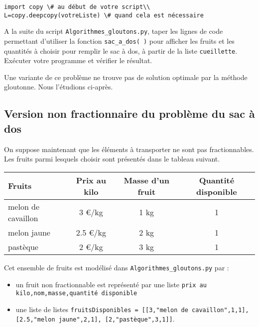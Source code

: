 \begin{lstlisting}
import copy \# au début de votre script\\
L=copy.deepcopy(votreListe) \# quand cela est nécessaire
\end{lstlisting}

\begin{question}
A la suite du script \lstinline{Algorithmes_gloutons.py}, taper les lignes de code permettant d’utiliser la fonction \lstinline{sac_a_dos( )} pour afficher les  fruits et les quantités à choisir pour remplir le sac à dos, à partir de la liste \lstinline{cueillette}. Exécuter votre programme et vérifier le résultat.
\end{question}


\vspace*{0.5cm}
Une variante de ce problème ne trouve pas de solution optimale par la méthode gloutonne. Nous l'étudions ci-après.

\subsection*{Version non fractionnaire du problème du sac à dos}
\label{sec:VersionNonFractionnaireDuProblèmeDuSacÀDos}

On suppose maintenant que les éléments à transporter ne sont pas fractionnables. Les fruits parmi lesquels choisir sont présentés dans le tableau suivant.


\begin{table}[h]
	\centering
		\begin{tabular}{|l|c|c|c|}
\hline
Fruits  & Prix au kilo & Masse d’un fruit & Quantité disponible\\
\hline
melon de cavaillon & 3 €/kg & 1 kg & 1\\
melon jaune  & 2.5 €/kg & 2 kg & 1\\
pastèque & 2 €/kg & 3 kg & 1 \\

\hline
		\end{tabular}
	\label{tab_fruit2}
\end{table}

Cet ensemble de fruits est modélisé dans \lstinline{Algorithmes_gloutons.py} par :
\begin{itemize}
\item un fruit non fractionnable est représenté par une liste \lstinline{prix au kilo,nom,masse,quantité disponible}
\item une liste de listes \lstinline{fruitsDisponibles = [[3,"melon de cavaillon",1,1], [2.5,"melon jaune",2,1], [2,"pastèque",3,1]]}.
\end{itemize}



